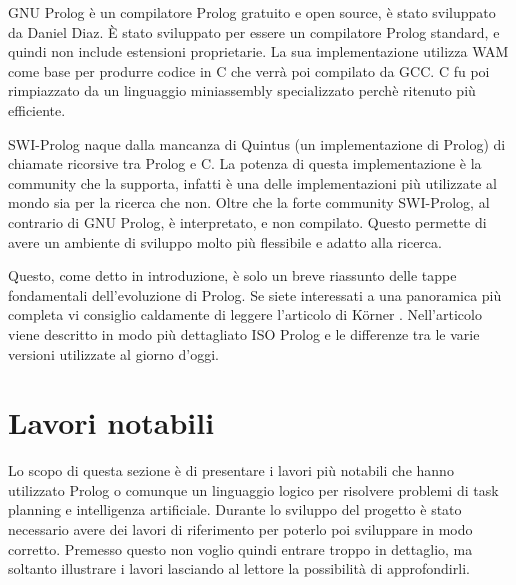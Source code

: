 GNU Prolog è un compilatore Prolog gratuito e open source, è stato sviluppato da Daniel Diaz. È stato sviluppato per essere un compilatore Prolog standard, e quindi non include estensioni proprietarie. La sua implementazione utilizza WAM come base per produrre codice in C che verrà poi compilato da GCC. C fu poi rimpiazzato da un linguaggio miniassembly specializzato
perchè ritenuto più efficiente. 

SWI-Prolog naque dalla mancanza di Quintus (un implementazione di Prolog) di chiamate ricorsive tra Prolog e C. La potenza di questa implementazione è la community che la supporta, infatti è una delle implementazioni più utilizzate al mondo sia per la ricerca che non. Oltre che la forte community
SWI-Prolog, al contrario di GNU Prolog, è interpretato, e non compilato. Questo permette di avere un ambiente di sviluppo molto più flessibile e adatto alla ricerca.

Questo, come detto in introduzione, è solo un breve riassunto delle tappe fondamentali dell'evoluzione di Prolog. Se siete interessati a una panoramica più completa vi consiglio caldamente di leggere l'articolo di K{\"o}rner \cite{korner2022fifty}. 
Nell'articolo viene descritto in modo più dettagliato ISO Prolog e le differenze tra le varie versioni utilizzate al giorno d'oggi.
\section{Lavori notabili}
\label{sec:lavori}
Lo scopo di questa sezione è di presentare i lavori più notabili che hanno utilizzato Prolog o comunque un linguaggio logico per risolvere problemi di task planning e intelligenza artificiale.
Durante lo sviluppo del progetto è stato necessario avere dei lavori di riferimento per poterlo poi sviluppare in modo corretto.
Premesso questo non voglio quindi entrare troppo in dettaglio, ma soltanto illustrare i lavori lasciando al lettore la possibilità di approfondirli.

